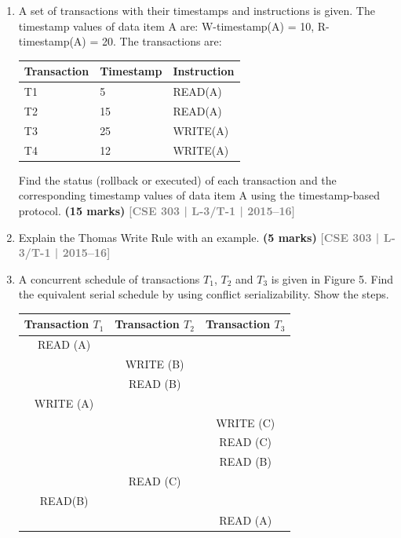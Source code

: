 \documentclass[12pt]{article}
\newcommand{\yr}[1]{\hfill\textcolor{gray}{\small\textbf{[#1]}}}
\newcommand{\mk}[1]{\textcolor{orange!70!black}{\small\textbf{(#1 marks)}}}
\begin{document}
\begin{enumerate}
\item A set of transactions with their timestamps and instructions is given. The timestamp values of data item A are: W-timestamp(A) = 10, R-timestamp(A) = 20. The transactions are:

\medskip
\begin{center}
\begin{tabular}{lll}
\toprule
\textbf{Transaction} & \textbf{Timestamp} & \textbf{Instruction}\\
\midrule
T1 & 5 & READ(A)\\
T2 & 15 & READ(A)\\
T3 & 25 & WRITE(A)\\
T4 & 12 & WRITE(A)\\
\bottomrule
\end{tabular}
\end{center}
Find the status (rollback or executed) of each transaction and the corresponding timestamp values of data item A using the timestamp-based protocol.
\mk{15} \yr{CSE 303 | L-3/T-1 | 2015--16}


\item Explain the Thomas Write Rule with an example.
\mk{5} \yr{CSE 303 | L-3/T-1 | 2015--16}


\item A concurrent schedule of transactions $T_1$, $T_2$ and $T_3$ is given in Figure 5. Find the equivalent serial schedule by using conflict serializability. Show the steps.

\begin{center}
  \renewcommand{\arraystretch}{1.4} %
    \begin{tabular}{c|c|c}
        \textbf{Transaction $T_1$} & \textbf{Transaction $T_2$} & \textbf{Transaction $T_3$} \\ \hline
        READ (A) &           &           \\ \hline
                 & WRITE (B) &           \\ \hline
                 & READ (B)  &           \\ \hline
        WRITE (A)&           &           \\ \hline
                 &           & WRITE (C) \\ \hline
                 &           & READ (C)  \\ \hline
                 &           & READ (B)  \\ \hline
                 & READ (C)  &           \\ \hline
        READ(B)  &           &           \\ \hline
                 &           & READ (A)  \\ \hline
    \end{tabular}
    

\end{center}
\end{enumerate}
\end{document}
